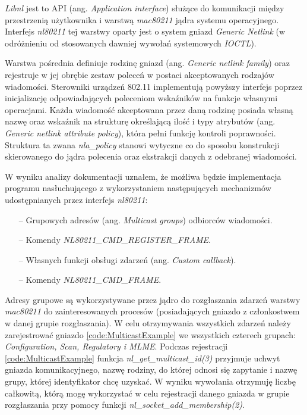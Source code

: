 \emph{Libnl} jest to API (ang. \emph{Application interface}) służące do komunikacji między przestrzenią użytkownika i warstwą \emph{mac80211} jądra systemu operacyjnego. Interfejs \emph{nl80211} tej warstwy oparty jest o system gniazd \emph{Generic Netlink} (w odróżnieniu od stosowanych dawniej wywołań systemowych \emph{IOCTL}).  

Warstwa pośrednia definiuje rodzinę gniazd (ang. \emph{Generic netlink family}) oraz rejestruje w jej obrębie zestaw poleceń w postaci akceptowanych rodzajów wiadomości. Sterowniki urządzeń 802.11 implementują powyższy interfejs poprzez inicjalizację odpowiadających poleceniom wskaźników na funkcje własnymi operacjami. Każda wiadomość akceptowana przez daną rodzinę posiada własną nazwę oraz wskaźnik na strukturę określającą ilość i typy atrybutów (ang. \emph{Generic netlink attribute policy}), która pełni funkcję kontroli poprawności. Struktura ta zwana \emph{nla\_policy} stanowi wytyczne co do sposobu konstrukcji skierowanego do jądra polecenia oraz ekstrakcji danych z odebranej wiadomości.

W wyniku analizy dokumentacji uznałem, że możliwa będzie implementacja programu nasłuchującego z wykorzystaniem następujących mechanizmów udostępnianych przez interfejs \emph{nl80211}:

\begin{itemize}
\item[--] Grupowych adresów (ang. \emph{Multicast groups}) odbiorców wiadomości.
\item[--] Komendy \emph{NL80211\_CMD\_REGISTER\_FRAME}.
\item[--] Własnych funkcji obsługi zdarzeń (ang. \emph{Custom callback}).
\item[--] Komendy \emph{NL80211\_CMD\_FRAME}.
\end{itemize}

Adresy grupowe są wykorzystywane przez jądro do rozgłaszania zdarzeń warstwy \emph{mac80211} do zainteresowanych procesów (posiadających gniazdo z członkostwem w danej grupie rozgłaszania). W celu otrzymywania wszystkich zdarzeń należy zarejestrować gniazdo \ref{code:MulticastExample} we wszystkich czterech grupach: \emph{Configuration, Scan, Regulatory i MLME}. Podczas rejestracji \ref{code:MulticastExample} funkcja \emph{nl\_get\_multicast\_id(3)} przyjmuje uchwyt gniazda komunikacyjnego, nazwę rodziny, do której odnosi się zapytanie i nazwę grupy, której identyfikator chcę uzyskać. W wyniku wywołania otrzymuję liczbę całkowitą, którą mogę wykorzystać w celu rejestracji danego gniazda w grupie rozgłaszania przy pomocy funkcji \emph{nl\_socket\_add\_membership(2)}.


